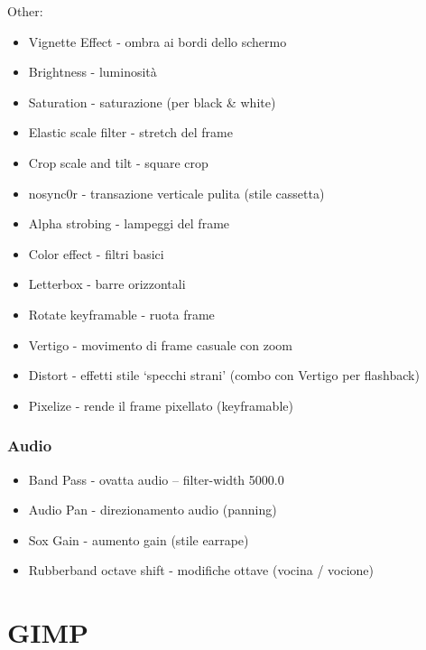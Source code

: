 \documentclass[12pt]{article}
\begin{document}
\vspace{15px}

Other:
\begin{itemize}
    \item Vignette Effect - ombra ai bordi dello schermo
    \item Brightness - luminosità
    \item Saturation - saturazione (per black \& white)
    \item Elastic scale filter - stretch del frame 
    \item Crop scale and tilt - square crop
    \item nosync0r - transazione verticale pulita (stile cassetta)
    \item Alpha strobing - lampeggi del frame
    \item Color effect - filtri basici
    \item Letterbox - barre orizzontali
    \item Rotate keyframable - ruota frame
    \item Vertigo - movimento di frame casuale con zoom 
    \item Distort - effetti stile `specchi strani' (combo con Vertigo per flashback)
    \item Pixelize - rende il frame pixellato (keyframable)
\end{itemize}




\vspace{20px}
\subsubsection{Audio}


\begin{itemize}
    \item Band Pass - ovatta audio -- filter-width 5000.0
    \item Audio Pan - direzionamento audio (panning)
    \item Sox Gain  - aumento gain (stile earrape)
    \item Rubberband octave shift - modifiche ottave (vocina / vocione)
\end{itemize}




\clearpage{}

\section{GIMP}
\end{document}

